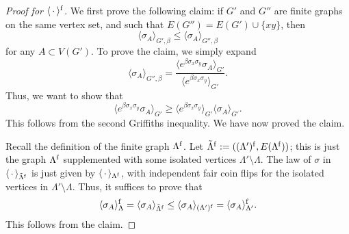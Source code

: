\begin{proof}[Proof for $\langle\,\cdot\,\rangle^{\operatorname{f}}$]
    We first prove the following claim:
    if $G'$ and $G''$ are finite graphs on the same vertex set,
    and such that $E(G'')=E(G')\cup\{xy\}$,
    then
    \[
        \langle\sigma_A\rangle_{G',\beta}
        \leq
        \langle\sigma_A\rangle_{G'',\beta}
    \]
    for any $A\subset V(G')$.
    To prove the claim, we simply expand 
    \[
        \langle\sigma_A\rangle_{G'',\beta}
        =
        \frac{
            \langle   e^{\beta\sigma_x\sigma_y}\sigma_A\rangle_{G'}
        }{
            \langle e^{\beta\sigma_x\sigma_y}\rangle_{G'}
        }.
    \]
    Thus, we want to show that
    \[
            \langle e^{\beta\sigma_x\sigma_y} \sigma_A \rangle_{G'}
            \geq 
            \langle e^{\beta\sigma_x\sigma_y}\rangle_{G'}
            \langle\sigma_A\rangle_{G'}.
    \]
    This follows from the second Griffiths inequality.
    We have now proved the claim.

    Recall the definition of the finite graph $\Lambda^{\operatorname{f}}$.
    Let $\tilde\Lambda^{\operatorname{f}}:=((\Lambda')^{\operatorname{f}},E(\Lambda^{\operatorname{f}}))$;
    this is just the graph $\Lambda^{\operatorname{f}}$
    supplemented with some isolated vertices $\Lambda'\setminus\Lambda$.
    The law of $\sigma$ in $\langle\,\cdot\,\rangle_{\tilde\Lambda^{\operatorname{f}}}$
    is just given by $\langle\,\cdot\,\rangle_{\Lambda^{\operatorname{f}}}$,
    with independent fair coin flips for the isolated vertices in $\Lambda'\setminus\Lambda$.
    Thus, it suffices to prove that
    \[
        \langle\sigma_A\rangle^{\operatorname{f}}_{\Lambda}
        =
        \langle\sigma_A\rangle_{\tilde\Lambda^{\operatorname{f}}}
        \leq
        \langle\sigma_A\rangle_{(\Lambda')^{\operatorname{f}}}
        =
        \langle\sigma_A\rangle^{\operatorname{f}}_{\Lambda'}
        .
    \]
    This follows from the claim.
\end{proof}


